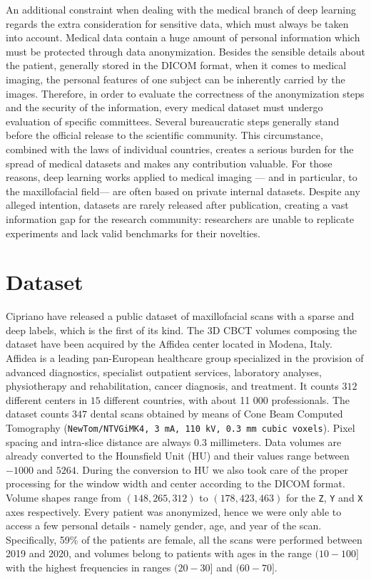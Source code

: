 An additional constraint when dealing with the medical branch of deep learning
regards the extra consideration for sensitive data, which must always be taken
into account. Medical data contain a huge amount of personal information which
must be protected through data anonymization. Besides the sensible details about
the patient, generally stored in the DICOM format, when it comes to medical
imaging, the personal features of one subject can be inherently carried by the
images. Therefore, in order to evaluate the correctness of the anonymization
steps and the security of the information, every medical dataset must undergo
evaluation of specific committees. Several bureaucratic steps generally stand
before the official release to the scientific community. This circumstance,
combined with the laws of individual countries, creates a serious burden for the
spread of medical datasets and makes any contribution valuable. For those
reasons, deep learning works applied to medical imaging — and in particular, to
the maxillofacial field— are often based on private internal datasets. Despite
any alleged intention, datasets are rarely released after publication, creating
a vast information gap for the research community: researchers are unable to
replicate experiments and lack valid benchmarks for their novelties.

\section{Dataset}
Cipriano \etal \cite{cipriano2022deep} have released a public dataset of
maxillofacial scans with a sparse and deep labels, which is the first of its
kind.
The 3D CBCT volumes composing the dataset have been acquired by the Affidea
center located in Modena, Italy. Affidea is a leading pan-European healthcare
group specialized in the provision of advanced diagnostics, specialist
outpatient services, laboratory analyses, physiotherapy and rehabilitation,
cancer diagnosis, and treatment. It counts $312$ different centers in $15$
different countries, with about 11 000 professionals. The dataset counts $347$
dental scans obtained by means of Cone Beam Computed Tomography
(\texttt{NewTom/NTVGiMK4, 3 mA, 110 kV, 0.3 mm cubic voxels}). Pixel spacing and
intra-slice distance are always $0.3$ millimeters. Data volumes are already
converted to the Hounsfield Unit (HU) and their values range between $-1000$ and
$5264$. During the conversion to HU we also took care of the proper processing
for the window width and center according to the DICOM format. Volume shapes
range from $(148, 265, 312)$ to $(178, 423, 463)$ for the \texttt{Z}, \texttt{Y}
and \texttt{X} axes respectively. Every patient was anonymized, hence we were
only able to access a few personal details - namely gender, age, and year of the
scan. Specifically, 59\% of the patients are female, all the scans were
performed between 2019 and 2020, and volumes belong to patients with ages in the
range $(10-100]$ with the highest frequencies in ranges $(20-30]$ and $(60-70]$.

